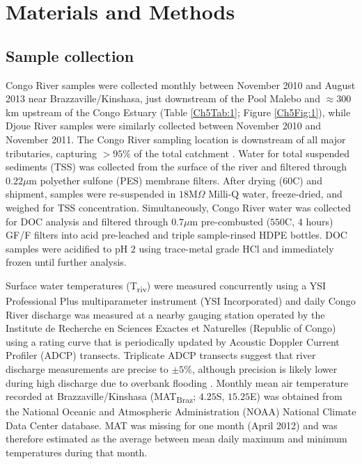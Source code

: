 \section{Materials and Methods}

\subsection{Sample collection}

Congo River samples were collected monthly between November 2010 and August 2013 near Brazzaville/Kinshasa, just downstream of the Pool Malebo and $\approx 300$ km upstream of the Congo Estuary (Table \ref{Ch5Tab:1}; Figure \ref{Ch5Fig:1}), while Djoue River samples were similarly collected between November 2010 and November 2011. The Congo River sampling location is downstream of all major tributaries, capturing $>95$\% of the total catchment \citep{Spencer:2012en}. Water for total suspended sediments (TSS) was collected from the surface of the river and filtered through $0.22 \mu$m polyether sulfone (PES) membrane filters. After drying ($60$\textdegree C) and shipment, samples were re-suspended in $18$M$\Omega$ Milli-Q water, freeze-dried, and weighed for TSS concentration. Simultaneously, Congo River water was collected for DOC analysis and filtered through $0.7 \mu$m pre-combusted ($550$\textdegree C, 4 hours) GF/F filters into acid pre-leached and triple sample-rinsed HDPE bottles. DOC samples were acidified to pH $2$ using trace-metal grade HCl and immediately frozen until further analysis.

Surface water temperatures (T\textsubscript{riv}) were measured concurrently using a YSI Professional Plus multiparameter instrument (YSI Incorporated) and daily Congo River discharge was measured at a nearby gauging station operated by the Institute de Recherche en Sciences Exactes et Naturelles (Republic of Congo) using a rating curve that is periodically updated by Acoustic Doppler Current Profiler (ADCP) transects. Triplicate ADCP transects suggest that river discharge measurements are precise to $\pm 5$\%, although precision is likely lower during high discharge due to overbank flooding \citep{Spencer:2014vp}. Monthly mean air temperature recorded at Brazzaville/Kinshasa (MAT\textsubscript{Braz}; $4.25$\textdegree S, $15.25$\textdegree E) was obtained from the National Oceanic and Atmospheric Administration (NOAA) National Climate Data Center database. MAT was missing for one month (April 2012) and was therefore estimated as the average between mean daily maximum and minimum temperatures during that month. 

